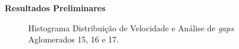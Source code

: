 \documentclass[xcolor=dvipsnames,10pt]{beamer}
\begin{document}
\begin{frame}{\textbf{Resultados Preliminares}}
\begin{figure}[!htbp]
    \caption{Histograma Distribuição de Velocidade e Análise de \textit{gaps} Aglomerados 15, 16 e 17.}
  \end{figure}
\end{frame}
\end{document}
